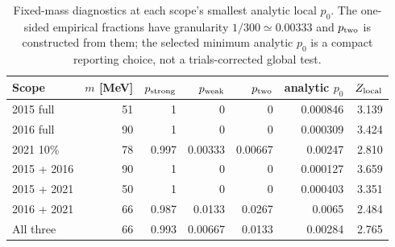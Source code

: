 \begin{table}[htbp]
\centering
\scriptsize
\setlength{\tabcolsep}{5.1pt}
\begin{tabular}{lrrrrrr}
\toprule
Scope & $m$ [MeV] & $p_{\rm strong}$ & $p_{\rm weak}$ & $p_{\rm two}$ & analytic $p_0$ & $Z_{\rm local}$ \\
\midrule
2015 full & 51 & \num{1} & \num{0} & \num{0} & \num{0.000846} & 3.139 \\
2016 full & 90 & \num{1} & \num{0} & \num{0} & \num{0.000309} & 3.424 \\
2021 10\% & 78 & \num{0.997} & \num{0.00333} & \num{0.00667} & \num{0.00247} & 2.810 \\
2015 + 2016 & 90 & \num{1} & \num{0} & \num{0} & \num{0.000127} & 3.659 \\
2015 + 2021 & 50 & \num{1} & \num{0} & \num{0} & \num{0.000403} & 3.351 \\
2016 + 2021 & 66 & \num{0.987} & \num{0.0133} & \num{0.0267} & \num{0.0065} & 2.484 \\
All three & 66 & \num{0.993} & \num{0.00667} & \num{0.0133} & \num{0.00284} & 2.765 \\
\bottomrule
\end{tabular}
\caption{Fixed-mass diagnostics at each scope's smallest analytic local $p_0$. The one-sided empirical fractions have granularity $1/300\simeq0.00333$ and $p_{\rm two}$ is constructed from them; the selected minimum analytic $p_0$ is a compact reporting choice, not a trials-corrected global test.}
\label{tab:pvalue-summary}
\end{table}
